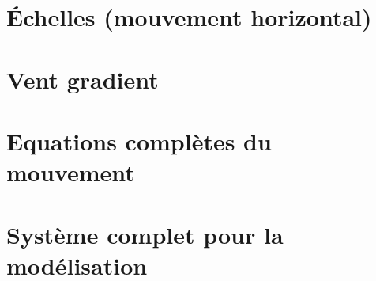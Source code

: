 \documentclass[a4paper,DIV16,10pt]{scrartcl}
\begin{document}
\newpage
\section{\'Echelles (mouvement horizontal)}


\newpage
\section{Vent gradient}


\newpage
\section{Equations complètes du mouvement}


\newpage
\section{Système complet pour la modélisation}

\end{document}
